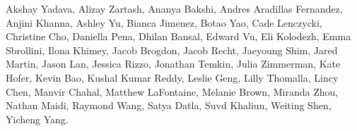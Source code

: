 Akshay Yadava,
Alizay Zartash,
Ananya Bakshi,
Andres Aradillas Fernandez,
Anjini Khanna,
Ashley Yu,
Bianca Jimenez,
Botao Yao,
Cade Lenczycki,
Christine Cho,
Daniella Pena,
Dhilan Bansal,
Edward Vu,
Eli Kolodezh,
Emma Sbrollini,
Ilona Khimey,
Jacob Brogdon,
Jacob Recht,
Jaeyoung Shim,
Jared Martin,
Jason Lan,
Jessica Rizzo,
Jonathan Temkin,
Julia Zimmerman,
Kate Hofer,
Kevin Bao,
Kushal Kumar Reddy,
Leslie Geng,
Lilly Thomalla,
Lincy Chen,
Manvir Chahal,
Matthew LaFontaine,
Melanie Brown,
Miranda Zhou,
Nathan Maidi,
Raymond Wang,
Satya Datla,
Suvd Khaliun,
Weiting Shen,
Yicheng Yang.
